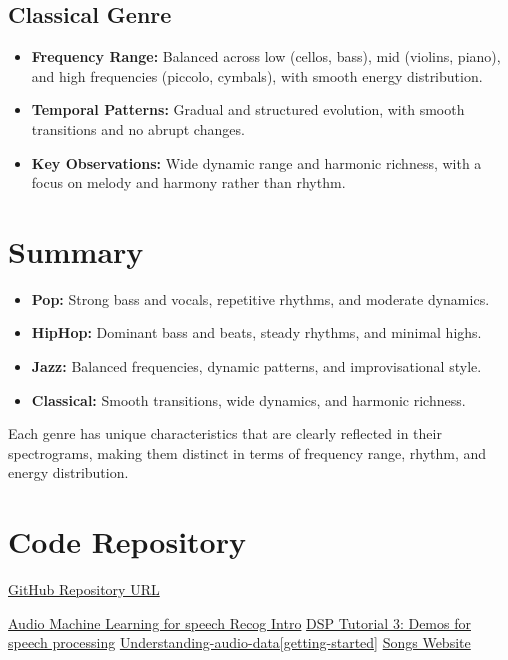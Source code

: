 \documentclass[a4paper,12pt]{article}
\begin{document}
\subsection{Classical Genre}
\begin{itemize}
    \item \textbf{Frequency Range:} Balanced across low (cellos, bass), mid (violins, piano), and high frequencies (piccolo, cymbals), with smooth energy distribution.
    \item \textbf{Temporal Patterns:} Gradual and structured evolution, with smooth transitions and no abrupt changes.
    \item \textbf{Key Observations:} Wide dynamic range and harmonic richness, with a focus on melody and harmony rather than rhythm.
\end{itemize}
\newpage
\section{Summary}
\begin{itemize}
    \item \textbf{Pop:} Strong bass and vocals, repetitive rhythms, and moderate dynamics.
    \item   \textbf{HipHop:} Dominant bass and beats, steady rhythms, and minimal highs.
    \item \textbf{Jazz:} Balanced frequencies, dynamic patterns, and improvisational style.
    \item \textbf{Classical:} Smooth transitions, wide dynamics, and harmonic richness.
\end{itemize}
Each genre has unique characteristics that are clearly reflected in their spectrograms, making them distinct in terms of frequency range, rhythm, and energy distribution.


\newpage
\section{Code Repository} 
\href{https://github.com/IITJ-M23CSA521/M23CSA521_PA1.git}{GitHub Repository URL}

%
\begin{thebibliography}{9}
     \href{https://www.kaggle.com/code/sujaykapadnis/audio-machine-learning-for-speech-recog-intro}{Audio Machine Learning for speech Recog Intro}
     \href{https://www.kaggle.com/code/jerrypeng/dsp-tutorial-3-demos-for-speech-processing}{DSP Tutorial 3: Demos for speech processing}
     \href{https://www.kaggle.com/code/santoshkumar/understanding-audio-data-getting-started}{Understanding-audio-data[getting-started]}
     \href{https://www.jamendo.com/start}{Songs Website}
\end{thebibliography}
\end{document}
